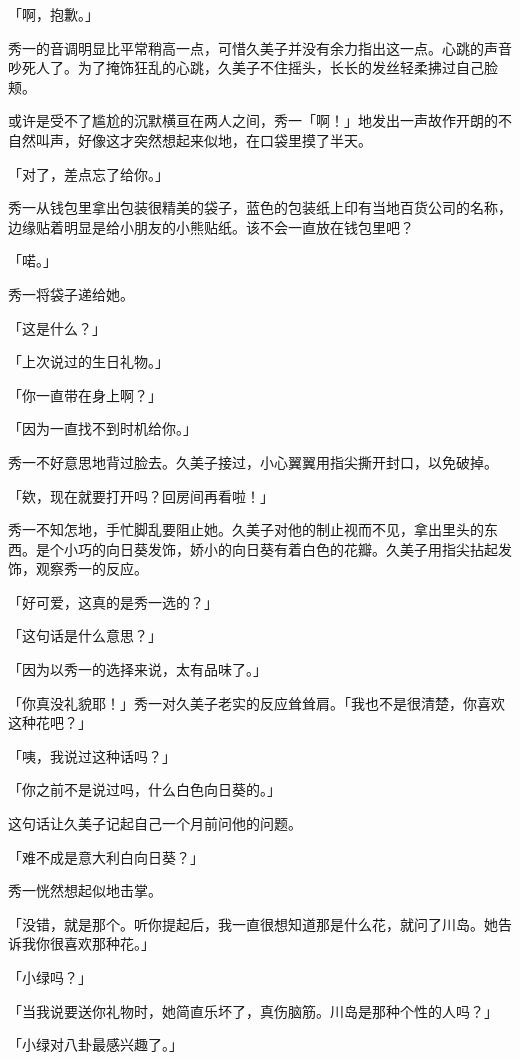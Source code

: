 \documentclass[UTF8]{ctexart}
\begin{document}
    「啊，抱歉。」 

    秀一的音调明显比平常稍高一点，可惜久美子并没有余力指出这一点。心跳的声音吵死人了。为了掩饰狂乱的心跳，久美子不住摇头，长长的发丝轻柔拂过自己脸颊。 

    或许是受不了尴尬的沉默横亘在两人之间，秀一「啊！」地发出一声故作开朗的不自然叫声，好像这才突然想起来似地，在口袋里摸了半天。 

    「对了，差点忘了给你。」 

    秀一从钱包里拿出包装很精美的袋子，蓝色的包装纸上印有当地百货公司的名称，边缘贴着明显是给小朋友的小熊贴纸。该不会一直放在钱包里吧？ 

    「喏。」 

    秀一将袋子递给她。 

    「这是什么？」 

    「上次说过的生日礼物。」 

    「你一直带在身上啊？」 

    「因为一直找不到时机给你。」 

    秀一不好意思地背过脸去。久美子接过，小心翼翼用指尖撕开封口，以免破掉。 

    「欸，现在就要打开吗？回房间再看啦！」 

    秀一不知怎地，手忙脚乱要阻止她。久美子对他的制止视而不见，拿出里头的东西。是个小巧的向日葵发饰，娇小的向日葵有着白色的花瓣。久美子用指尖拈起发饰，观察秀一的反应。 

    「好可爱，这真的是秀一选的？」 

    「这句话是什么意思？」 

    「因为以秀一的选择来说，太有品味了。」 

    「你真没礼貌耶！」秀一对久美子老实的反应耸耸肩。「我也不是很清楚，你喜欢这种花吧？」 

    「咦，我说过这种话吗？」 

    「你之前不是说过吗，什么白色向日葵的。」 

    这句话让久美子记起自己一个月前问他的问题。 

    「难不成是意大利白向日葵？」 

    秀一恍然想起似地击掌。 

    「没错，就是那个。听你提起后，我一直很想知道那是什么花，就问了川岛。她告诉我你很喜欢那种花。」 

    「小绿吗？」 

    「当我说要送你礼物时，她简直乐坏了，真伤脑筋。川岛是那种个性的人吗？」 

    「小绿对八卦最感兴趣了。」 
\end{document}
